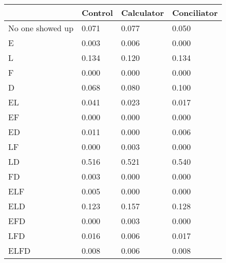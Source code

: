 \begin{tabular}{rrrr}
\toprule
      & \multicolumn{1}{c}{Control} & \multicolumn{1}{c}{Calculator} & \multicolumn{1}{c}{Conciliator} \\
\midrule
\multicolumn{1}{l}{No one showed up} & \multicolumn{1}{l}{0.071} & \multicolumn{1}{l}{0.077} & \multicolumn{1}{l}{0.050} \\
\multicolumn{1}{l}{E} & \multicolumn{1}{l}{0.003} & \multicolumn{1}{l}{0.006} & \multicolumn{1}{l}{0.000} \\
\multicolumn{1}{l}{L} & \multicolumn{1}{l}{0.134} & \multicolumn{1}{l}{0.120} & \multicolumn{1}{l}{0.134} \\
\multicolumn{1}{l}{F} & \multicolumn{1}{l}{0.000} & \multicolumn{1}{l}{0.000} & \multicolumn{1}{l}{0.000} \\
\multicolumn{1}{l}{D} & \multicolumn{1}{l}{0.068} & \multicolumn{1}{l}{0.080} & \multicolumn{1}{l}{0.100} \\
\multicolumn{1}{l}{EL} & \multicolumn{1}{l}{0.041} & \multicolumn{1}{l}{0.023} & \multicolumn{1}{l}{0.017} \\
\multicolumn{1}{l}{EF} & \multicolumn{1}{l}{0.000} & \multicolumn{1}{l}{0.000} & \multicolumn{1}{l}{0.000} \\
\multicolumn{1}{l}{ED} & \multicolumn{1}{l}{0.011} & \multicolumn{1}{l}{0.000} & \multicolumn{1}{l}{0.006} \\
\multicolumn{1}{l}{LF} & \multicolumn{1}{l}{0.000} & \multicolumn{1}{l}{0.003} & \multicolumn{1}{l}{0.000} \\
\multicolumn{1}{l}{LD} & \multicolumn{1}{l}{0.516} & \multicolumn{1}{l}{0.521} & \multicolumn{1}{l}{0.540} \\
\multicolumn{1}{l}{FD} & \multicolumn{1}{l}{0.003} & \multicolumn{1}{l}{0.000} & \multicolumn{1}{l}{0.000} \\
\multicolumn{1}{l}{ELF} & \multicolumn{1}{l}{0.005} & \multicolumn{1}{l}{0.000} & \multicolumn{1}{l}{0.000} \\
\multicolumn{1}{l}{ELD} & \multicolumn{1}{l}{0.123} & \multicolumn{1}{l}{0.157} & \multicolumn{1}{l}{0.128} \\
\multicolumn{1}{l}{EFD} & \multicolumn{1}{l}{0.000} & \multicolumn{1}{l}{0.003} & \multicolumn{1}{l}{0.000} \\
\multicolumn{1}{l}{LFD} & \multicolumn{1}{l}{0.016} & \multicolumn{1}{l}{0.006} & \multicolumn{1}{l}{0.017} \\
\multicolumn{1}{l}{ELFD} & \multicolumn{1}{l}{0.008} & \multicolumn{1}{l}{0.006} & \multicolumn{1}{l}{0.008} \\
\bottomrule
\end{tabular}%

